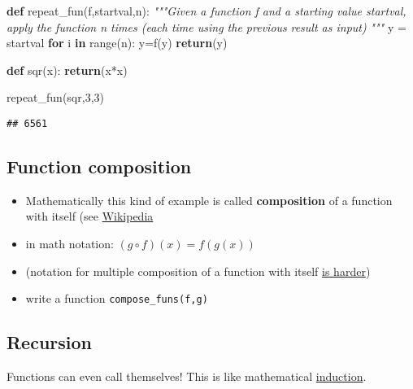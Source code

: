 \documentclass[]{tufte-handout}
\newenvironment{Shaded}{}{}
\newcommand{\KeywordTok}[1]{\textcolor[rgb]{0.00,0.44,0.13}{\textbf{{#1}}}}
\newcommand{\DecValTok}[1]{\textcolor[rgb]{0.25,0.63,0.44}{{#1}}}
\newcommand{\CommentTok}[1]{\textcolor[rgb]{0.38,0.63,0.69}{\textit{{#1}}}}
\newcommand{\ControlFlowTok}[1]{\textcolor[rgb]{0.00,0.44,0.13}{\textbf{{#1}}}}
\newcommand{\OperatorTok}[1]{\textcolor[rgb]{0.40,0.40,0.40}{{#1}}}
\newcommand{\BuiltInTok}[1]{{#1}}
\newcommand{\NormalTok}[1]{{#1}}
\providecommand{\tightlist}{%
  \setlength{\itemsep}{0pt}\setlength{\parskip}{0pt}}
\begin{document}
\begin{Shaded}
\begin{Highlighting}[]
\KeywordTok{def} \NormalTok{repeat_fun(f,startval,n):}
    \CommentTok{"""Given a function f and a starting value startval,}
\CommentTok{    apply the function n times (each time using the previous}
\CommentTok{    result as input)}
\CommentTok{    """}
    \NormalTok{y }\OperatorTok{=} \NormalTok{startval}
    \ControlFlowTok{for} \NormalTok{i }\KeywordTok{in} \BuiltInTok{range}\NormalTok{(n):}
        \NormalTok{y}\OperatorTok{=}\NormalTok{f(y)}
    \ControlFlowTok{return}\NormalTok{(y)}

\KeywordTok{def} \NormalTok{sqr(x):}
    \ControlFlowTok{return}\NormalTok{(x}\OperatorTok{*}\NormalTok{x)}

\NormalTok{repeat_fun(sqr,}\DecValTok{3}\NormalTok{,}\DecValTok{3}\NormalTok{)}
\end{Highlighting}
\end{Shaded}

\begin{verbatim}
## 6561
\end{verbatim}

\subsection{Function composition}\label{function-composition}

\begin{itemize}
\tightlist
\item
  Mathematically this kind of example is called \textbf{composition} of
  a function with itself (see
  \href{https://en.wikipedia.org/wiki/Function_composition}{Wikipedia}
\item
  in math notation: \((g\circ f)(x) = f(g(x))\)
\item
  (notation for multiple composition of a function with itself
  \href{https://math.stackexchange.com/questions/926247/notation-for-repeated-composition-of-functions}{is
  harder})
\item
  write a function \texttt{compose\_funs(f,g)}
\end{itemize}

\subsection{Recursion}\label{recursion}

Functions can even call themselves! This is like mathematical
\href{https://en.wikipedia.org/wiki/Mathematical_induction}{induction}.
\end{document}
